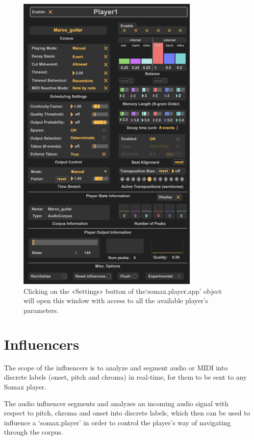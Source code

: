 \begin{figure}[H]
    \centering        
 	\includegraphics[width=0.8\textwidth, keepaspectratio]{img/playerui_2-7.png}
    \caption{Clicking on the «Settings» button of the`somax.player.app' object will open this window with access to all the available player's parameters.}
    \label{fig:player_settings}
\end{figure}

\clearpage

\section{Influencers}

The scope of the influencers is to analyze and segment audio or MIDI into discrete labels (onset, pitch and chroma) in real-time, for them to be sent to any Somax player.

The audio influencer segments and analyzes an incoming audio signal with respect to pitch, chroma and onset into discrete labels, which then can be used to influence a `somax.player' in order to control the player's way of navigating through the corpus.

